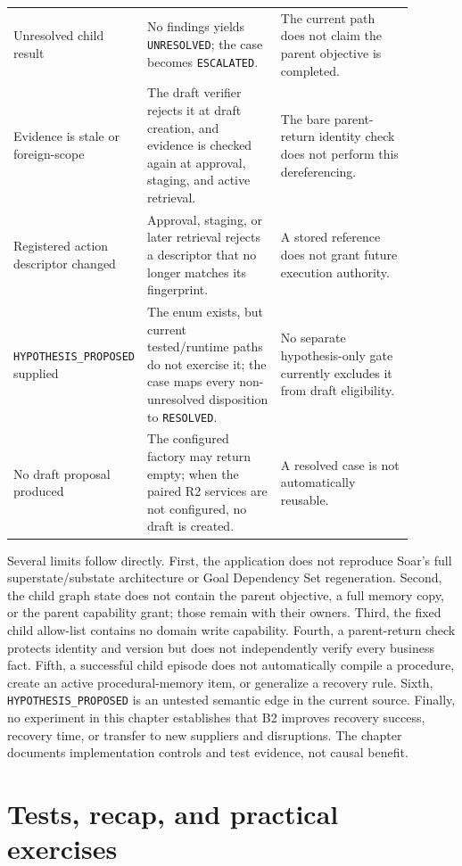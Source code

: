 \begin{longtable}{>{\raggedright\arraybackslash}p{0.19\linewidth} >{\raggedright\arraybackslash}p{0.35\linewidth} >{\raggedright\arraybackslash}p{0.35\linewidth}}
Unresolved child result & No findings yields \texttt{UNRESOLVED}; the case becomes \texttt{ESCALATED}. & The current path does not claim the parent objective is completed. \\
Evidence is stale or foreign-scope & The draft verifier rejects it at draft creation, and evidence is checked again at approval, staging, and active retrieval. & The bare parent-return identity check does not perform this dereferencing. \\
Registered action descriptor changed & Approval, staging, or later retrieval rejects a descriptor that no longer matches its fingerprint. & A stored reference does not grant future execution authority. \\
\texttt{HYPOTHESIS\_\allowbreak PROPOSED} supplied & The enum exists, but current tested/runtime paths do not exercise it; the case maps every non-unresolved disposition to \texttt{RESOLVED}. & No separate hypothesis-only gate currently excludes it from draft eligibility. \\
No draft proposal produced & The configured factory may return empty; when the paired R2 services are not configured, no draft is created. & A resolved case is not automatically reusable. \\
\bottomrule
\end{longtable}
\normalsize

Several limits follow directly. First, the application does not reproduce Soar's full superstate/substate architecture or Goal Dependency Set regeneration. Second, the child graph state does not contain the parent objective, a full memory copy, or the parent capability grant; those remain with their owners. Third, the fixed child allow-list contains no domain write capability. Fourth, a parent-return check protects identity and version but does not independently verify every business fact. Fifth, a successful child episode does not automatically compile a procedure, create an active procedural-memory item, or generalize a recovery rule. Sixth, \texttt{HYPOTHESIS\_\allowbreak PROPOSED} is an untested semantic edge in the current source. Finally, no experiment in this chapter establishes that B2 improves recovery success, recovery time, or transfer to new suppliers and disruptions. The chapter documents implementation controls and test evidence, not causal benefit.

\section{Tests, recap, and practical exercises}
\label{sec:ch22-tests-recap}

